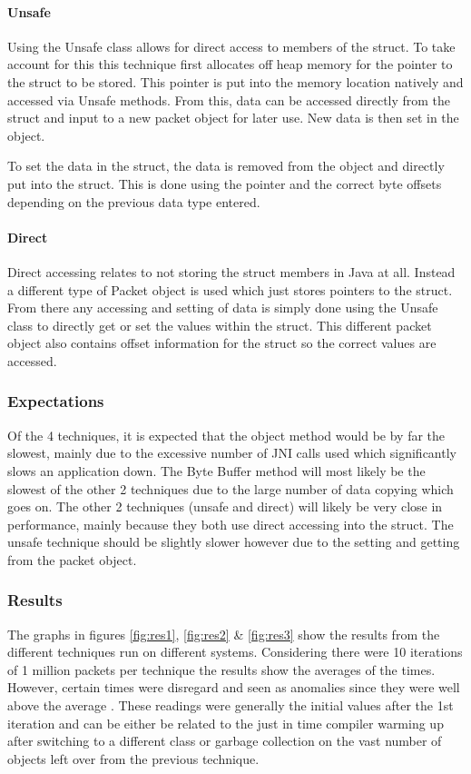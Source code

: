 \documentclass[final_report.tex]{subfiles}
\begin{document}
\paragraph*{Unsafe}
Using the Unsafe class allows for direct access to members of the struct. To take account for this this technique first allocates off heap memory for the pointer to the struct to be stored. This pointer is put into the memory location natively and accessed via Unsafe methods. From this, data can be accessed directly from the struct and input to a new packet object for later use. New data is then set in the object.

To set the data in the struct, the data is removed from the object and directly put into the struct. This is done using the pointer and the correct byte offsets depending on the previous data type entered.

\paragraph*{Direct}
Direct accessing relates to not storing the struct members in Java at all. Instead a different type of Packet object is used which just stores pointers to the struct. From there any accessing and setting of data is simply done using the Unsafe class to directly get or set the values within the struct. This different packet object also contains offset information for the struct so the correct values are accessed.

\subsubsection{Expectations}
Of the 4 techniques, it is expected that the object method would be by far the slowest, mainly due to the excessive number of JNI calls used which significantly slows an application down. The Byte Buffer method will most likely be the slowest of the other 2 techniques due to the large number of data copying which goes on. The other 2 techniques (unsafe and direct) will likely be very close in performance, mainly because they both use direct accessing into the struct. The unsafe technique should be slightly slower however due to the setting and getting from the packet object.


\subsubsection{Results}
The graphs in figures \ref{fig:res1}, \ref{fig:res2} \& \ref{fig:res3} show the results from the different techniques run on different systems. Considering there were 10 iterations of 1 million packets per technique the results show the averages of the times. However, certain times were disregard and seen as anomalies since they were well above the average . These readings were generally the initial values after the 1st iteration and can be either be related to the just in time compiler warming up after switching to a different class or garbage collection on the vast number of objects left over from the previous technique.
\end{document}
